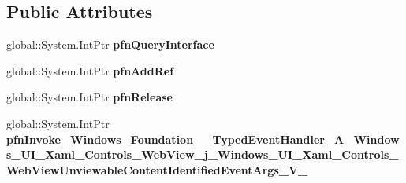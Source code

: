 \subsection*{Public Attributes}
\begin{DoxyCompactItemize}
\item 
\mbox{\label{struct_windows_1_1_foundation_1_1_typed_event_handler___a___windows___u_i___xaml___controls___we525068a3adb52520cb6e4320f7738461_af19145b6b7facd59eb9531fd1b95969d}} 
global\+::\+System.\+Int\+Ptr {\bfseries pfn\+Query\+Interface}
\item 
\mbox{\label{struct_windows_1_1_foundation_1_1_typed_event_handler___a___windows___u_i___xaml___controls___we525068a3adb52520cb6e4320f7738461_a5dfaa864e23a214105fed6ea5cc971f1}} 
global\+::\+System.\+Int\+Ptr {\bfseries pfn\+Add\+Ref}
\item 
\mbox{\label{struct_windows_1_1_foundation_1_1_typed_event_handler___a___windows___u_i___xaml___controls___we525068a3adb52520cb6e4320f7738461_a4431efd986dbd1b25133dae7528a27d0}} 
global\+::\+System.\+Int\+Ptr {\bfseries pfn\+Release}
\item 
\mbox{\label{struct_windows_1_1_foundation_1_1_typed_event_handler___a___windows___u_i___xaml___controls___we525068a3adb52520cb6e4320f7738461_a9a15b030bc051dffca87d48fbc1cb6f0}} 
global\+::\+System.\+Int\+Ptr {\bfseries pfn\+Invoke\+\_\+\+Windows\+\_\+\+Foundation\+\_\+\+\_\+\+Typed\+Event\+Handler\+\_\+\+A\+\_\+\+Windows\+\_\+\+U\+I\+\_\+\+Xaml\+\_\+\+Controls\+\_\+\+Web\+View\+\_\+j\+\_\+\+Windows\+\_\+\+U\+I\+\_\+\+Xaml\+\_\+\+Controls\+\_\+\+Web\+View\+Unviewable\+Content\+Identified\+Event\+Args\+\_\+\+V\+\_\+}
\end{DoxyCompactItemize}
